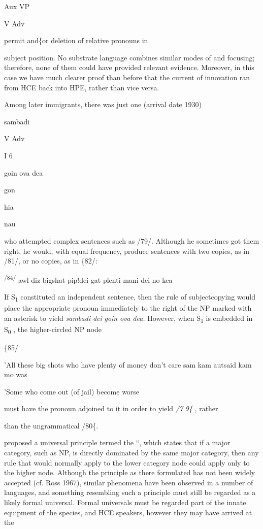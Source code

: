 Aux VP

V Adv

permit  and\{or deletion of relative pronouns in

subject position. No substrate language combines similar modes of  and focusing; therefore, none of them could have pro\-vided relevant evidence. Moreover, in this case we have much clearer proof than before that the current of innovation ran from HCE back into HPE, rather than vice versa.

Among later immigrants, there was just one (arrival date 1930)

sambadi

V Adv

I 6

goin ova dea

gon

hia

nau

who attempted complex sentences such as /79/. Although he some\-times got them right, he would, with equal frequency, produce sen\-tences with two copies, as in /81/, or no copies, as in \{82/:

\textsuperscript{/84/ }awl diz bigshat pip!dei gat plenti mani dei no kea

If S\textsubscript{1}\textsubscript{ }constituted an independent sentence, then the rule of subject\-copying would place the appropriate pronoun immediately to the right of the NP marked with an asterisk to yield \textit{sambadi} \textit{dei} \textit{goin} \textit{ova} \textit{dea.} However, when S\textsubscript{1}\textsubscript{ }is embedded in S\textsubscript{0}\textsubscript{ }, the higher-circled NP node

\{85/

'All these big shots who have plenty of money don't care sam kam autsaid kam mo was

'Some who come out (of jail) become worse

must have the pronoun adjoined to it in order to yield \textit{/7} \textit{9\{} , rather

than the ungrammatical /80\{.

\citet{Chomsky1964} proposed a universal principle termed the ``, which states that if a major category, such as NP, is directly dominated by the same major category, then any rule that would normally apply to the lower category node could apply only to the higher node. Although the principle as there formulated has not been widely accepted (cf. Ross 1967), similar phenomena have been observed in a number of languages, and something resembling such a principle must still be regarded as a likely formal universal. Formal universals must be regarded part of the innate equipment of the species, and HCE speakers, however they may have arrived at the

